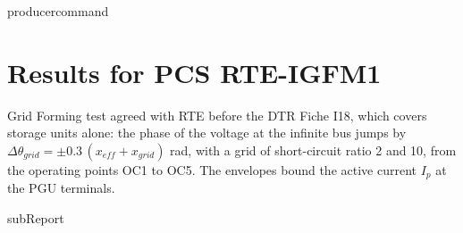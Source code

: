 {{ producercommand }}



    \section{Results for PCS RTE-IGFM1}

    Grid Forming test agreed with RTE before the DTR Fiche I18, which covers storage units
    alone: the phase of the voltage at the infinite bus jumps by
    \(\Delta\theta_{grid} = \pm 0.3\,(x_{eff} + x_{grid})\) rad, with a grid of short-circuit
    ratio 2 and 10, from the operating points OC1 to OC5. The envelopes bound the active current
    \(I_p\) at the PGU terminals.

    {{subReport}}
    \newpage
